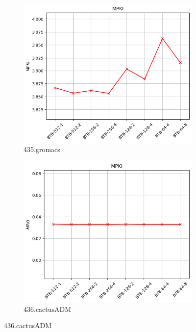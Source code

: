 \documentclass{article}
\begin{document}
\begin{figure}[H]
    \vspace{0.5cm} %

    \begin{subfigure}[b]{0.45\textwidth}
        \includegraphics[width=\textwidth]{figures/5_4/435.gromacs.cslab_branch_preds_ref.out.png}
        \caption{435.gromacs}
        \label{fig:plot55}
    \end{subfigure}
    \hfill
    \begin{subfigure}[b]{0.45\textwidth}
        \includegraphics[width=\textwidth]{figures/5_4/436.cactusADM.cslab_branch_preds_ref.out.png}
        \caption{436.cactusADM}
        \label{fig:plot56}
    \end{subfigure}


\end{figure}
\end{document}
